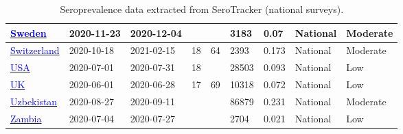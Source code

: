 \begin{table}[ht]
\begin{center}
\begin{tabular}{p{2cm} | p{1.6cm} | p{1.6cm} | p{0.8cm} | p{0.8cm} | p{1cm} | p{1.3cm} | p{1.2cm} | p{1.2cm}}
           \hline 
           \href{https://www.folkhalsomyndigheten.se/contentassets/376f9021a4c84da08de18ac597284f0c/pavisning-antikroppar-genomgangen-covid-19-blodgivare-delrapport-2.pdf}{\textcolor{blue}{Sweden}} & 2020-11-23 & 2020-12-04 &  &  & 3183 & 0.07 & National & Moderate \\ 
           \hline 
           \href{https://dx.doi.org/10.1186/s12916-022-02431-z}{\textcolor{blue}{Switzerland}} & 2020-10-18 & 2021-02-15 & 18 & 64 & 2393 & 0.173 & National & Moderate \\ 
           \hline 
           \href{https://www.thelancet.com/journals/lancet/article/PIIS0140-6736(20)32009-2/fulltext}{\textcolor{blue}{USA}} & 2020-07-01 & 2020-07-31 & 18 &  & 28503 & 0.093 & National & Low \\ 
           \hline 
           \href{https://www.gov.uk/government/publications/national-covid-19-surveillance-reports}{\textcolor{blue}{UK}} & 2020-06-01 & 2020-06-28 & 17 & 69 & 10318 & 0.072 & National & Low \\ 
           \hline 
           \href{https://ejmcm.com/article\_9453.html}{\textcolor{blue}{Uzbekistan}} & 2020-08-27 & 2020-09-11 &  &  & 86879 & 0.231 & National & Moderate \\ 
           \hline 
           \href{https://www.thelancet.com/journals/langlo/article/PIIS2214-109X(21)00053-X/fulltext}{\textcolor{blue}{Zambia}} & 2020-07-04 & 2020-07-27 &  &  & 2704 & 0.021 & National & Low \\ 
           \hline 
           
           
           
    \end{tabular}
    \end{center}
    \caption{Seroprevalence data extracted from SeroTracker (national surveys).}
    \label{tab:sero_national}
\end{table}


